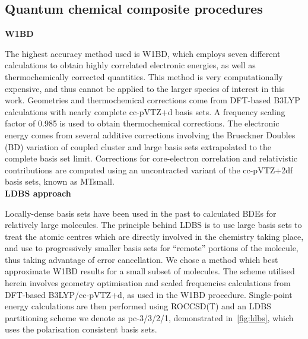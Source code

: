 \subsection{Quantum chemical composite procedures}

\noindent \textbf{W1BD}

The highest accuracy method used is W1BD, which employs seven different calculations to obtain highly correlated electronic energies, as well as thermochemically corrected quantities. This method is very computationally expensive, and thus cannot be applied to the larger species of interest in this work. Geometries and thermochemical corrections come from DFT-based B3LYP calculations with nearly complete cc-pVTZ+d basis sets. A frequency scaling factor of 0.985 is used to obtain thermochemical corrections. The electronic energy comes from several additive corrections involving the Brueckner Doubles\cite{Barnes2009} (BD) variation of coupled cluster and large basis sets extrapolated to the complete basis set limit. Corrections for core-electron correlation and relativistic contributions are computed using an uncontracted variant of the cc-pVTZ+2df basis sets, known as MTsmall.\cite{Martin1999}
\\

\noindent \textbf{LDBS approach}

Locally-dense basis sets have been used in the past to calculated BDEs for relatively large molecules.\cite{DiLabio1998, DiLabio1999LDBS, Wright2001} The principle  behind LDBS is to use large basis sets to treat the atomic centres which are directly involved in the chemistry taking place, and use to progressively smaller basis sets for ``remote'' portions of the molecule, thus taking advantage of error cancellation. We chose a method which best approximate W1BD results for a small subset of molecules. The scheme utilised herein involves geometry optimisation and scaled frequencies calculations from DFT-based B3LYP/cc-pVTZ+d, as used in the W1BD procedure. Single-point energy calculations are then performed using ROCCSD(T) and an LDBS partitioning scheme we denote as pc-3/3/2/1, demonstrated in~\ref{fig:ldbs}, which uses the polarisation consistent basis sets.\cite{Jensen2001}

